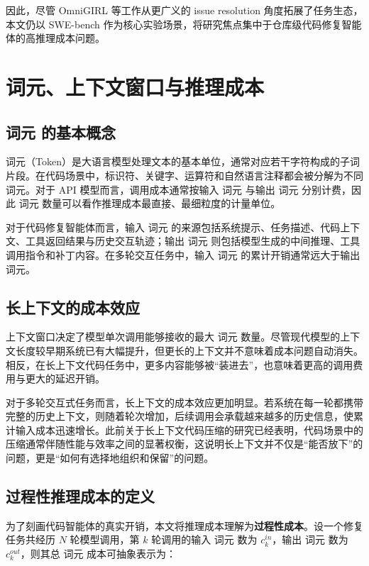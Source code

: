 因此，尽管 OmniGIRL 等工作从更广义的 issue resolution 角度拓展了任务生态，本文仍以 SWE-bench 作为核心实验场景，将研究焦点集中于仓库级代码修复智能体的高推理成本问题。


\section{词元、上下文窗口与推理成本}

\subsection{词元 的基本概念}

词元（Token）是大语言模型处理文本的基本单位，通常对应若干字符构成的子词片段。在代码场景中，标识符、关键字、运算符和自然语言注释都会被分解为不同 词元。对于 API 模型而言，调用成本通常按输入 词元 与输出 词元 分别计费，因此 词元 数量可以看作推理成本最直接、最细粒度的计量单位。

对于代码修复智能体而言，输入 词元 的来源包括系统提示、任务描述、代码上下文、工具返回结果与历史交互轨迹；输出 词元 则包括模型生成的中间推理、工具调用指令和补丁内容。在多轮交互任务中，输入 词元 的累计开销通常远大于输出 词元。

\subsection{长上下文的成本效应}

上下文窗口决定了模型单次调用能够接收的最大 词元 数量。尽管现代模型的上下文长度较早期系统已有大幅提升，但更长的上下文并不意味着成本问题自动消失。相反，在长上下文代码任务中，更多内容能够被“装进去”，也意味着更高的调用费用与更大的延迟开销。

对于多轮交互式任务而言，长上下文的成本效应更加明显。若系统在每一轮都携带完整的历史上下文，则随着轮次增加，后续调用会承载越来越多的历史信息，使累计输入成本迅速增长。此前关于长上下文代码压缩的研究已经表明，代码场景中的压缩通常伴随性能与效率之间的显著权衡，这说明长上下文并不仅是“能否放下”的问题，更是“如何有选择地组织和保留”的问题。

\subsection{过程性推理成本的定义}

为了刻画代码智能体的真实开销，本文将推理成本理解为\textbf{过程性成本}。设一个修复任务共经历 $N$ 轮模型调用，第 $k$ 轮调用的输入 词元 数为 $c_k^{in}$，输出 词元 数为 $c_k^{out}$，则其总 词元 成本可抽象表示为：

